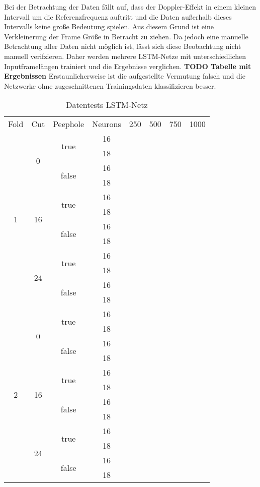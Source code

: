 Bei der Betrachtung der Daten fällt auf, dass der Doppler-Effekt in einem
kleinen Intervall um die Referenzfrequenz auftritt und die Daten außerhalb
dieses Intervalls keine große Bedeutung spielen. Aus diesem Grund ist eine
Verkleinerung der Frame Größe in Betracht zu ziehen. Da jedoch eine manuelle
Betrachtung aller Daten nicht möglich ist, lässt sich diese Beobachtung nicht
manuell verifzieren. Daher werden mehrere \ac{LSTM}-Netze mit unterschiedlichen
Inputframelängen trainiert und die Ergebnisse verglichen. \textbf{TODO Tabelle
mit Ergebnissen} Erstaunlicherweise ist die aufgestellte Vermutung falsch und die
Netzwerke ohne zugeschnittenen Trainingsdaten klassifizieren besser. 
\begin{table*}
\centering
\begin{tabular}{|c|c|c|c|c|c|c|c|}
\hline
 Fold 		& Cut & Peephole & Neurons & 250 & 500 & 750 & 1000 \\
 \multirow{12}{*}{1}&\multirow{4}{*}{0}&\multirow{2}{*}{true}&16&	&	&	&	\\
  & & &18&	&	&	&	\\
  & &\multirow{2}{*}{false}&16&	&	&	&	\\
  & & &18&	&	&	&	\\
  &\multirow{4}{*}{16}&\multirow{2}{*}{true}&16&	&	&	&	\\
  & & &18&	&	&	&	\\
  & &\multirow{2}{*}{false}&16&	&	&	&	\\
  & & &18&	&	&	&	\\
  &\multirow{4}{*}{24}&\multirow{2}{*}{true}&16&	&	&	&	\\
  & & &18&	&	&	&	\\
  & &\multirow{2}{*}{false}&16&	&	&	&	\\
  & & &18&	&	&	&	\\
  \multirow{12}{*}{2}&\multirow{4}{*}{0}&\multirow{2}{*}{true}&16&	&	&	&	\\
  & & &18&	&	&	&	\\
  & &\multirow{2}{*}{false}&16&	&	&	&	\\
  & & &18&	&	&	&	\\
  &\multirow{4}{*}{16}&\multirow{2}{*}{true}&16&	&	&	&	\\
  & & &18&	&	&	&	\\
  & &\multirow{2}{*}{false}&16&	&	&	&	\\
  & & &18&	&	&	&	\\
  &\multirow{4}{*}{24}&\multirow{2}{*}{true}&16&	&	&	&	\\
  & & &18&	&	&	&	\\
  & &\multirow{2}{*}{false}&16&	&	&	&	\\
  & & &18&	&	&	&	\\
\hline
\end{tabular}
\caption{Datentests LSTM-Netz}
\label{tab:inputtests}
\end{table*}

